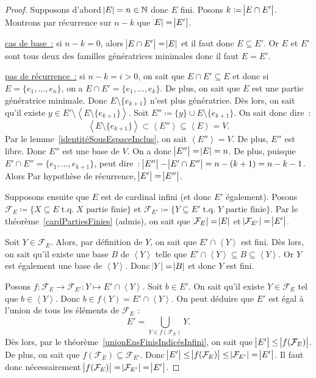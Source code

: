 \documentclass{article}
\DeclareMathOperator{\tq}{\text{ t.q. }}
\newcommand{\N}{\mathbb N}
\newcommand{\eng}[1]{\left\langle#1\right\rangle}
\theoremstyle{definition}
\theoremstyle{remark}
\begin{document}
		\begin{proof} Supposons d'abord $\abs E = n \in \N$ donc $E$ fini. Posons $k \coloneqq \abs {E \cap E'}$. Montrons par récurrence sur $n-k$ que
		$\abs E = \abs {E'}$.

		\underline{cas de base~:} si $n-k = 0$, alors $\abs {E \cap E'} = \abs {E}$ et il faut donc $E \subseteq E'$. Or $E$ et $E'$ sont tous deux des familles
		génératrices minimales donc il faut $E = E'$.

		\underline {pas de récurrence~:} si $n-k = i > 0$, on sait que $E \cap E' \subseteq E$ et donc si $E = \{e_1, \dotsc, e_n\}$, on a
		$E \cap E' = \{e_1, \dotsc, e_k\}$. De plus, on sait que $E$ est une partie génératrice minimale. Donc $E \setminus \{e_{k+1}\}$ n'est plus génératrice.
		Dès lors, on sait qu'il existe $y \in E' \setminus \eng {E \setminus \{e_{k+1}\}}$. Soit $E'' \coloneqq \{y\} \cup E \setminus \{e_{k+1}\}$. On sait donc dire~:
		\[\eng {E \setminus \{e_{k+1}\}} \subset \eng {E''} \subseteq \eng E = V.\] Par le lemme~\ref{identitéSousEspaceInclus}, on sait $\eng {E''} = V$. De plus, $E''$
		est libre. Donc $E''$ est une base de $V$. On a donc $\abs {E''} = \abs E = n$. De plus, puisque $E' \cap E'' = \{e_1, \dotsc, e_{k+1}\}$, peut dire~:
		$\abs {E''} - \abs {E' \cap E''} = n - (k+1) = n-k-1$. Alors Par hypothèse de récurrence, $\abs {E'} = \abs {E''}$.

		Supposons ensuite que $E$ est de cardinal infini (et donc $E'$ également). Posons $\mathcal F_E \coloneqq \{X \subseteq E \tq X \text{ partie finie}\}$ et
		$\mathcal F_{E'} \coloneqq \{Y \subseteq E' \tq Y \text{ partie finie}\}$. Par le théorème~\ref{cardPartiesFinies} (admis), on sait que
		$\abs {\mathcal F_E} = \abs E$ et $\abs {\mathcal F_{E'}} = \abs {E'}$.

		Soit $Y \in \mathcal F_E$. Alors, par définition de $Y$, on sait que $E' \cap \eng Y$ est fini. Dès lors, on sait qu'il existe une base $B$ de $\eng Y$
		telle que $E' \cap \eng Y \subseteq B \subseteq \eng Y$. Or $Y$ est également une base de $\eng Y$. Donc $\abs Y = \abs B$ et donc $Y$ est fini.

		Posons $f : \mathcal F_E \to \mathcal F_{E'} : Y \mapsto E' \cap \eng Y$. Soit $b \in E'$. On sait qu'il existe $Y \in \mathcal F_E$ tel que $b \in \eng Y$.
		Donc $b \in f(Y) = E' \cap \eng Y$. On peut déduire que $E'$ est égal à l'union de tous les éléments de $\mathcal F_E$ :
		\[E' = \bigcup_{Y \in f(\mathcal F_E)}Y.\] Dès lors, par le théorème~\ref{unionEnsFinisIndicésInfini}, on sait que $\abs {E'} \leq \abs {f(\mathcal F_E)}$.
		De plus, on sait que $f(\mathcal F_E) \subseteq \mathcal F_{E'}$. Donc $\abs {E'} \leq \abs {f(\mathcal F_E)} \leq \abs {\mathcal F_{E'}} = \abs {E'}$.
		Il faut donc nécessairement $\abs {f(\mathcal F_{E})} = \abs {\mathcal F_{E'}} = \abs {E'}$.


\end{proof}
\end{document}
